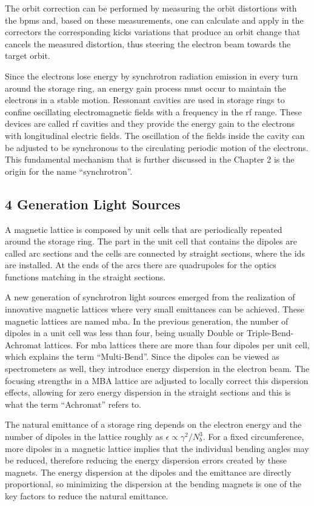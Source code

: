 The orbit correction can be performed by measuring the orbit distortions with the \glspl{bpm} and, based on these measurements, one can calculate and apply in the correctors the corresponding kicks variations that produce an orbit change that cancels the measured distortion, thus steering the electron beam towards the target orbit.

Since the electrons lose energy by synchrotron radiation emission in every turn around the storage ring, an energy gain process must occur to maintain the electrons in a stable motion. Ressonant cavities are used in storage rings to confine oscillating electromagnetic fields with a frequency in the \gls{rf} range. These devices are called \gls{rf} cavities and they provide the energy gain to the electrons with longitudinal electric fields. The oscillation of the fields inside the cavity can be adjusted to be synchronous to the circulating periodic motion of the electrons. This fundamental mechanism that is further discussed in the Chapter 2 is the origin for the name ``synchrotron''. 
\subsection{4 Generation Light Sources}\label{subsec:fourth_generation}
A magnetic lattice is composed by unit cells that are periodically repeated around the storage ring. The part in the unit cell that contains the dipoles are called arc sections and the cells are connected by straight sections, where the \glspl{id} are installed. At the ends of the arcs there are quadrupoles for the optics functions matching in the straight sections.

A new generation of synchrotron light sources emerged from the realization of innovative magnetic lattices where very small emittances can be achieved. These magnetic lattices are named \gls{mba}. In the previous generation, the number of dipoles in a unit cell was less than four, being usually Double or Triple-Bend-Achromat lattices. For \gls{mba} lattices there are more than four dipoles per unit cell, which explains the term ``Multi-Bend''. Since the dipoles can be viewed as spectrometers as well, they introduce energy dispersion in the electron beam. The focusing strengths in a MBA lattice are adjusted to locally correct this dispersion effects, allowing for zero energy dispersion in the straight sections and this is what the term ``Achromat'' refers to. 

The natural emittance of a storage ring depends on the electron energy and the number of dipoles in the lattice roughly as $\epsilon \propto \gamma^2/N_{b}^3$. For a fixed circumference, more dipoles in a magnetic lattice implies that the individual bending angles may be reduced, therefore reducing the energy dispersion errors created by these magnets. The energy dispersion at the dipoles and the emittance are directly proportional, so minimizing the dispersion at the bending magnets is one of the key factors to reduce the natural emittance.

